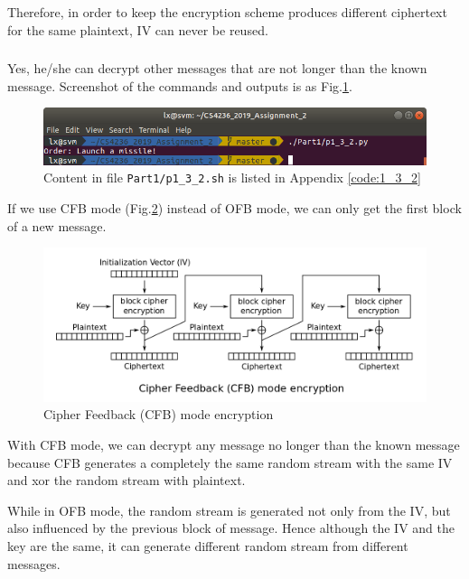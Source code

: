 Therefore, in order to keep the encryption scheme produces different ciphertext for the same plaintext, IV can never be reused.

\subsubsection{}
Yes, he/she can decrypt other messages that are not longer than the known message. Screenshot of the commands and outputs is as Fig.\ref{fig:p1_3_2}.

\begin{figure}[t!]
\centering
\includegraphics[width=\columnwidth]{resources/p1_3_2.png}
\caption{
    Content in file \texttt{Part1/p1\_3\_2.sh} is listed in Appendix \ref{code:1_3_2}
}
\label{fig:p1_3_2}
\end{figure}

If we use CFB mode (Fig.\ref{fig:CFB_encryption}) instead of OFB mode, we can only get the first block of a new message.

\begin{figure}[ht]
\centering
\includegraphics[width=\columnwidth]{resources/CFB_encryption.png}
\caption{
    Cipher Feedback (CFB) mode encryption \protect\footnotemark
}
\label{fig:CFB_encryption}
\end{figure}


With CFB mode, we can decrypt any message no longer than the known message because CFB generates a completely the same random stream with the same IV and xor the random stream with plaintext.

While in OFB mode, the random stream is generated not only from the IV, but also influenced by the previous block of message. Hence although the IV and the key are the same, it can generate different random stream from different messages.

